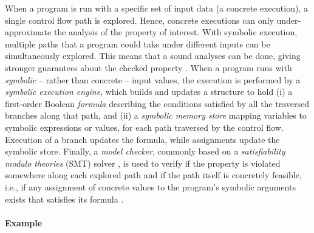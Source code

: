 When a program is run with a specific set of input data (a concrete execution), a single control flow path is explored. Hence, concrete executions can only under-approximate the analysis of the property of interest. With symbolic execution, multiple paths that a program could take under different inputs can be simultaneously explored. This means that a sound analyses can be done, giving stronger guarantees about the checked property%
. When a program runs with {\em symbolic} -- rather than concrete -- input values, the execution is performed by a {\em symbolic execution engine}, which builds and updates a structure to hold (i) a first-order Boolean {\em formula} describing the conditions satisfied by all the traversed branches along that path, and (ii) a {\em symbolic memory store} mapping variables to symbolic expressions or values, for each path traversed by the control flow. Execution of a branch updates the formula, while assignments update the symbolic store. Finally, a {\em model checker}, commonly based on a {\em satisfiability modulo theories} (SMT) solver%
, is used to verify if the property is violated somewhere along each explored path and if the path itself is concretely feasible, i.e., if any assignment of concrete values to the program's symbolic arguments exists that satisfies its formula%
.


\paragraph{Example}


